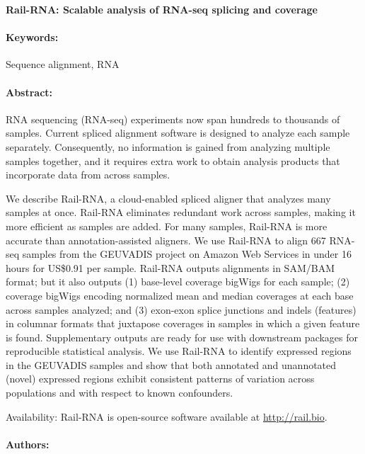 \noindent
\large {\bf Rail-RNA: Scalable analysis of RNA-seq splicing and coverage} 


\normalsize 


\noindent \paragraph{Keywords:} Sequence alignment, RNA

\noindent \paragraph{Abstract:} 

RNA sequencing (RNA-seq) experiments now span hundreds to thousands of samples.
Current spliced alignment software is designed to analyze each sample separately. Consequently, no
information is gained from analyzing multiple samples together, and it requires extra work to obtain analysis
products that incorporate data from across samples.

 We describe Rail-RNA, a cloud-enabled spliced aligner that analyzes many samples at once.
Rail-RNA eliminates redundant work across samples, making it more efficient as samples are added.
For many samples, Rail-RNA is more accurate than annotation-assisted aligners. We use Rail-RNA to
align 667 RNA-seq samples from the GEUVADIS project on Amazon Web Services in under 16 hours
for US\$0.91 per sample. Rail-RNA outputs alignments in SAM/BAM format; but it also outputs (1) base-level 
coverage bigWigs for each sample; (2) coverage bigWigs encoding normalized mean and median
coverages at each base across samples analyzed; and (3) exon-exon splice junctions and indels (features)
in columnar formats that juxtapose coverages in samples in which a given feature is found. Supplementary
outputs are ready for use with downstream packages for reproducible statistical analysis. We use Rail-RNA
to identify expressed regions in the GEUVADIS samples and show that both annotated and unannotated
(novel) expressed regions exhibit consistent patterns of variation across populations and with respect to
known confounders.

Availability: Rail-RNA is open-source software available at \url{http://rail.bio}.

\noindent \paragraph{Authors:} 

\noindent \paragraph{} 

